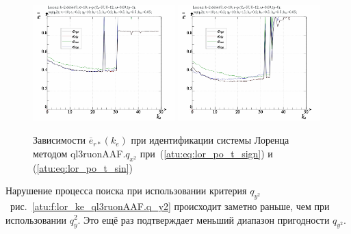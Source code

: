 \begin{figure}[ht!]
  \centerline{
    \includegraphics[width=0.49\textwidth]{p/cha/lor/ql3ruonAAF/lor_ql3ruonAAF_qx2-p_k_e_e_sign.png}
    \hfill
    \includegraphics[width=0.49\textwidth]{p/cha/lor/ql3ruonAAF/lor_ql3ruonAAF_qx2-p_k_e_e_sin.png}
  }
  \caption{Зависимости $\overline{e}_{r*}(k_e)$ при идентификации системы Лоренца методом ql3ruonAAF.$q_{x^2}$
   при~(\ref{atu:eq:lor_po_t_sign}) и (\ref{atu:eq:lor_po_t_sin})}
  \label{atu:f:lor_ke_ql3ruonAAF.q_x2}
\end{figure}

Нарушение процесса поиска при использовании критерия $q_{y^2}$~рис.~\ref{atu:f:lor_ke_ql3ruonAAF.q_y2}
происходит заметно раньше, чем при использовании $q_y^2$. Это
ещё раз подтверждает меньший диапазон пригодности $q_{y^2}$.

